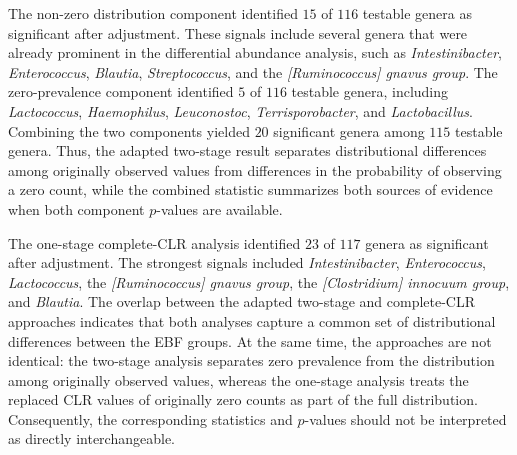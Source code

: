 The non-zero distribution component identified $15$ of $116$ testable genera as significant after adjustment. These signals include several genera that were already prominent in the differential abundance analysis, such as \emph{Intestinibacter}, \emph{Enterococcus}, \emph{Blautia}, \emph{Streptococcus}, and the \emph{[Ruminococcus] gnavus group}. The zero-prevalence component identified $5$ of $116$ testable genera, including \emph{Lactococcus}, \emph{Haemophilus}, \emph{Leuconostoc}, \emph{Terrisporobacter}, and \emph{Lactobacillus}. Combining the two components yielded $20$ significant genera among $115$ testable genera. Thus, the adapted two-stage result separates distributional differences among originally observed values from differences in the probability of observing a zero count, while the combined statistic summarizes both sources of evidence when both component $p$-values are available.

The one-stage complete-CLR analysis identified $23$ of $117$ genera as significant after adjustment. The strongest signals included \emph{Intestinibacter}, \emph{Enterococcus}, \emph{Lactococcus}, the \emph{[Ruminococcus] gnavus group}, the \emph{[Clostridium] innocuum group}, and \emph{Blautia}. The overlap between the adapted two-stage and complete-CLR approaches indicates that both analyses capture a common set of distributional differences between the EBF groups. At the same time, the approaches are not identical: the two-stage analysis separates zero prevalence from the distribution among originally observed values, whereas the one-stage analysis treats the replaced CLR values of originally zero counts as part of the full distribution. Consequently, the corresponding statistics and $p$-values should not be interpreted as directly interchangeable.

